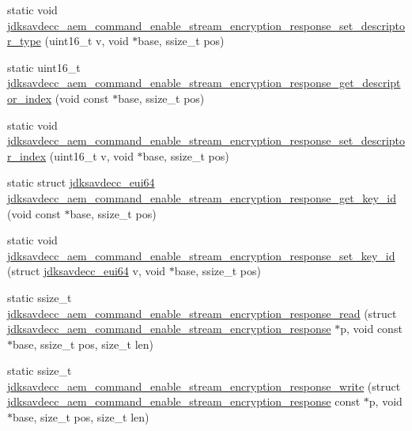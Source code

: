 \begin{DoxyCompactItemize}
\item 
static void \hyperlink{group__command__enable__stream__encryption__response_gaf9fdfa464337c775316c7f4fd15913f2}{jdksavdecc\+\_\+aem\+\_\+command\+\_\+enable\+\_\+stream\+\_\+encryption\+\_\+response\+\_\+set\+\_\+descriptor\+\_\+type} (uint16\+\_\+t v, void $\ast$base, ssize\+\_\+t pos)
\item 
static uint16\+\_\+t \hyperlink{group__command__enable__stream__encryption__response_gaa66dbd40bc9dfb7b6e4980478ea1536b}{jdksavdecc\+\_\+aem\+\_\+command\+\_\+enable\+\_\+stream\+\_\+encryption\+\_\+response\+\_\+get\+\_\+descriptor\+\_\+index} (void const $\ast$base, ssize\+\_\+t pos)
\item 
static void \hyperlink{group__command__enable__stream__encryption__response_ga5373912911bcd9d88382a5fb223060e0}{jdksavdecc\+\_\+aem\+\_\+command\+\_\+enable\+\_\+stream\+\_\+encryption\+\_\+response\+\_\+set\+\_\+descriptor\+\_\+index} (uint16\+\_\+t v, void $\ast$base, ssize\+\_\+t pos)
\item 
static struct \hyperlink{structjdksavdecc__eui64}{jdksavdecc\+\_\+eui64} \hyperlink{group__command__enable__stream__encryption__response_gaf63c9b6acb78344670f961ba96829fca}{jdksavdecc\+\_\+aem\+\_\+command\+\_\+enable\+\_\+stream\+\_\+encryption\+\_\+response\+\_\+get\+\_\+key\+\_\+id} (void const $\ast$base, ssize\+\_\+t pos)
\item 
static void \hyperlink{group__command__enable__stream__encryption__response_gaf8cb1e853f20bcac993f22a43b23b064}{jdksavdecc\+\_\+aem\+\_\+command\+\_\+enable\+\_\+stream\+\_\+encryption\+\_\+response\+\_\+set\+\_\+key\+\_\+id} (struct \hyperlink{structjdksavdecc__eui64}{jdksavdecc\+\_\+eui64} v, void $\ast$base, ssize\+\_\+t pos)
\item 
static ssize\+\_\+t \hyperlink{group__command__enable__stream__encryption__response_ga2337d57cd4712fc55febd6cd0ae38b05}{jdksavdecc\+\_\+aem\+\_\+command\+\_\+enable\+\_\+stream\+\_\+encryption\+\_\+response\+\_\+read} (struct \hyperlink{structjdksavdecc__aem__command__enable__stream__encryption__response}{jdksavdecc\+\_\+aem\+\_\+command\+\_\+enable\+\_\+stream\+\_\+encryption\+\_\+response} $\ast$p, void const $\ast$base, ssize\+\_\+t pos, size\+\_\+t len)
\item 
static ssize\+\_\+t \hyperlink{group__command__enable__stream__encryption__response_gadbe38e74bf00fe659124aec14e16f057}{jdksavdecc\+\_\+aem\+\_\+command\+\_\+enable\+\_\+stream\+\_\+encryption\+\_\+response\+\_\+write} (struct \hyperlink{structjdksavdecc__aem__command__enable__stream__encryption__response}{jdksavdecc\+\_\+aem\+\_\+command\+\_\+enable\+\_\+stream\+\_\+encryption\+\_\+response} const $\ast$p, void $\ast$base, size\+\_\+t pos, size\+\_\+t len)
\end{DoxyCompactItemize}


